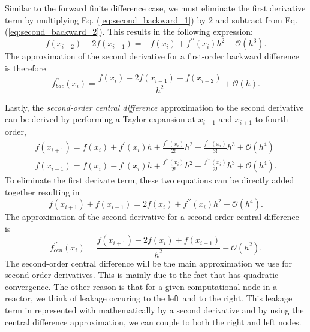 Similar to the forward finite difference case, we must eliminate the first derivative term by multiplying 
Eq. (\ref{eq:second_backward_1}) by 2 and subtract from Eq. (\ref{eq:second_backward_2}). This results in the following expression:
\begin{equation}
    f\left(x_{i-2}\right) - 2f\left(x_{i-1}\right) = -f\left(x_{i}\right) + f^{\prime\prime}\left(x_{i}\right)h^{2} - \mathcal{O}\left(h^{3}\right).
\end{equation}
The approximation of the second derivative for a first-order backward difference is therefore
\begin{equation}
    \boxed{f^{\prime\prime}_{bac}\left(x_{i}\right) = \frac{f\left(x_{i}\right) - 2f\left(x_{i-1}\right) + f\left(x_{i-2}\right)}{h^{2}} + \mathcal{O}\left(h\right)}.
\end{equation}
\par 
Lastly, the \emph{second-order central difference} approximation to the second derivative can be derived by performing 
a Taylor expansion at $x_{i-1}$ and $x_{i+1}$ to fourth-order,
\begin{eqnarray}
    f\left(x_{i+1}\right) = f\left(x_{i}\right) + f^{\prime}\left(x_{i}\right)h + \frac{f^{\prime\prime}\left(x_{i}\right)}{2!}h^{2} + \frac{f^{\prime\prime\prime}\left(x_{i}\right)}{3!}h^{3} + \mathcal{O}\left(h^{4}\right) \\
    f\left(x_{i-1}\right) = f\left(x_{i}\right) - f^{\prime}\left(x_{i}\right)h + \frac{f^{\prime\prime}\left(x_{i}\right)}{2!}h^{2} - \frac{f^{\prime\prime\prime}\left(x_{i}\right)}{3!}h^{3} + \mathcal{O}\left(h^{4}\right).
\end{eqnarray}
To eliminate the first derivate term, these two equations can be directly added together resulting in
\begin{equation}
    f\left(x_{i+1}\right) + f\left(x_{i-1}\right) = 2f\left(x_{i}\right) + f^{\prime\prime}\left(x_{i}\right)h^{2} + \mathcal{O}\left(h^{4}\right).
\end{equation}
The approximation of the second derivative for a second-order central difference is
\begin{equation}
    \boxed{f^{\prime\prime}_{cen}\left(x_{i}\right) = \frac{f\left(x_{i+1}\right) -2f\left(x_{i}\right) + f\left(x_{i-1}\right)}{h^{2}} - \mathcal{O}\left(h^{2}\right)}.
\end{equation}
The second-order central difference will be the main approximation we use for second order derivatives. This is mainly due to the
fact that has quadratic convergence. The other reason is that for a given computational node in a reactor, we think of leakage
occuring to the left and to the right. This leakage term in represented with mathematically by a second derivative and by using
the central difference approximation, we can couple to both the right and left nodes.

